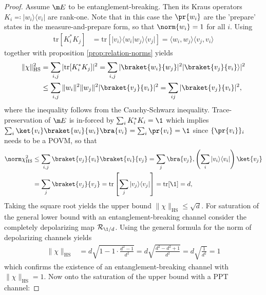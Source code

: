 \begin{proof}
Assume $\m E$ to be entanglement-breaking. Then its Kraus operators $K_i \eqqcolon |w_i\rangle\langle v_i|$ are rank-one. Note that in this case the $\pr {w_i}$ are the 'prepare' states in the measure-and-prepare form, so that $\norm{w_i}=1$ for all $i$. Using
\begin{align*}
\text{tr}[K_i^* K_j] &= \text{tr}[|v_i\rangle\langle w_i|w_j\rangle\langle v_j|] = \langle w_i, w_j \rangle \langle v_j, v_i \rangle
\end{align*}
together with proposition \ref{prop:relation-norms} yields
\begin{align*}
\|\chi\|_{\text{HS}}^2 &= \sum_{i,j} |\text{tr}[K_i^* K_j]|^2 = \sum_{i,j} |\braket{ w_i}{w_j} |^2 |\braket{v_j}{ v_i }\rangle|^2 \\
&\le \sum_{i,j} \|w_i\|^2 \|w_j\|^2 |\braket{ v_j}{ v_i} |^2 = \sum_{ij}\vert \braket{v_j}{v_i}\vert ^2,
\end{align*} 
where the inequality follows from the Cauchy-Schwarz inequality. Trace-preservation of $\m E$ is in-forced by $\sum_i K_i^*K_i = \1$ which implies $\sum_i \ket{v_i}\braket{w_i}{w_i}\bra{v_i} = \sum_i \pr{v_i} = \1$ since $\{\pr {v_i}\}_i$ needs to be a POVM, so that 
\begin{align*}
    \norm \chi_\text{HS}^2 &\leq \sum_{i,j} \braket{v_j}{v_i} \braket{v_i}{v_j} = \sum_j \bra{v_j}, \left( \sum_i |v_i\rangle\langle v_i| \right) \ket{v_j } \\ &= \sum_j \braket{ v_j}{v_j}  = \text{tr}\left[ \sum_j |v_j\rangle\langle v_j| \right] = \text{tr}[\1] = d, 
\end{align*}
Taking the square root yields the upper bound $\|\chi\|_{\text{HS}} \le \sqrt{d}$. For saturation of the general lower bound with an entanglement-breaking channel consider the completely depolarizing map $ \mathcal{R}_{\1/d}$. Using the general formula for the norm of depolarizing channels yields
\begin{align*}
\|\chi\|_{\text{HS}} &= d \sqrt{1 - 1 \cdot \frac{d^2-1}{d^2}} = d \sqrt{\frac{d^2 - d^2 + 1}{d^2}} = d \sqrt{\frac{1}{d^2}} = 1
\end{align*}
which confirms the existence of an entanglement-breaking channel with $\|\chi\|_{\text{HS}} = 1$. Now onto the saturation of the upper bound with a PPT channel: 
\end{proof}

